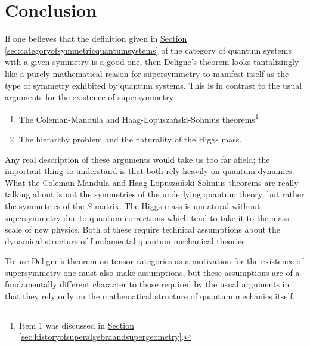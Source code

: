 \documentclass[a4paper,10pt]{scrreprt}
\theoremstyle{definition}
\theoremstyle{plain}
\theoremstyle{remark}
\begin{document}
\chapter{Conclusion}

If one believes that the definition given in \hyperref[sec:categoryofsymmetricquantumsystems]{Section \ref*{sec:categoryofsymmetricquantumsystems}} of the category of quantum systems with a given symmetry is a good one, then Deligne's theorem looks tantalizingly like a purely mathematical reason for supersymmetry to manifest itself as the type of symmetry exhibited by quantum systems. This is in contrast to the usual arguments for the existence of supersymmetry:
\begin{enumerate}
  \item The Coleman-Mandula and Haag-{\L}opusza{\'n}ski-Sohnius theorems\footnote{Item 1 was discussed in \hyperref[sec:historyofsuperalgebraandsupergeometry]{Section \ref*{sec:historyofsuperalgebraandsupergeometry}}.}

  \item The hierarchy problem and the naturality of the Higgs mass.
\end{enumerate}

Any real description of these arguments would take us too far afield; the important thing to understand is that both rely heavily on quantum dynamics. What the Coleman-Mandula and Haag-{\L}opusza{\'n}ski-Sohnius theorems are really talking about is not the symmetries of the underlying quantum theory, but rather the symmetries of the $S$-matrix. The Higgs mass is unnatural without supersymmetry due to quantum corrections which tend to take it to the mass scale of new physics. Both of these require technical assumptions about the dynamical structure of fundamental quantum mechanical theories.

To use Deligne's theorem on tensor categories as a motivation for the existence of supersymmetry one must also make assumptions, but these assumptions are of a fundamentally different character to those required by the usual arguments in that they rely only on the mathematical structure of quantum mechanics itself.
\end{document}
